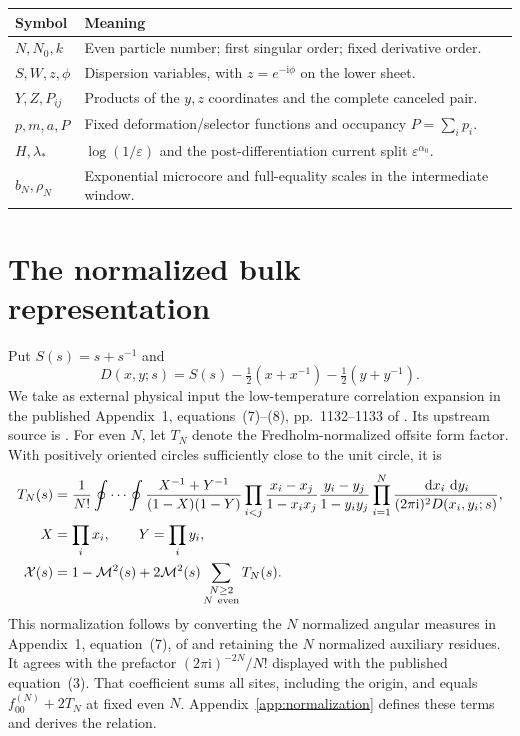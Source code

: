\documentclass[11pt]{article}
\numberwithin{equation}{section}
\theoremstyle{definition}
\newcommand{\dd}{\,\mathrm d}
\newcommand{\ii}{\mathrm i}
\newcommand{\eps}{\varepsilon}
\newcommand{\M}{\mathcal M}
\begin{document}
\begin{center}
\begin{tabular}{p{}p{}}
\toprule
Symbol & Meaning\\
\midrule
\(N,N_0,k\) & Even particle number; first singular order; fixed derivative order.\\
\(S,W,z,\phi\) & Dispersion variables, with \(z=e^{-\ii\phi}\) on the lower sheet.\\
\(Y,Z,P_{ij}\) & Products of the \(y,z\) coordinates and the complete canceled pair.\\
\(p,m,a,P\) & Fixed deformation/selector functions and occupancy \(P=\sum_i p_i\).\\
\(H,\lambda_*\) & \(\log(1/\eps)\) and the post-differentiation current split \(\eps^{\alpha_0}\).\\
\(b_N,\rho_N\) & Exponential microcore and full-equality scales in the intermediate window.\\
\bottomrule
\end{tabular}
\end{center}


\tableofcontents

\section{The normalized bulk representation}\label{sec:setup}
Put \(S(s)=s+s^{-1}\) and
\[
 D(x,y;s)=S(s)-\tfrac12(x+x^{-1})-\tfrac12(y+y^{-1}).
\]
We take as external physical input the low-temperature correlation
expansion in the published Appendix~1, equations~(7)--(8),
pp.~1132--1133 of \cite{TW2014}. Its upstream source is
\cite[Cor.~2.0, p.~351; Thm.~4.1, p.~361; Thm.~5.0, p.~374,
and proof pp.~375--378]{PalmerTracy1981}.
For even \(N\), let \(T_N\) denote the Fredholm-normalized offsite
form factor. With positively oriented circles sufficiently close to the
unit circle, it is
\begin{align}
 T_N(s)&=\frac1{N!}\oint\cdots\oint
 \frac{X^{-1}+Y^{-1}}{(1-X)(1-Y)}
 \prod_{i<j}\frac{x_i-x_j}{1-x_ix_j}
              \frac{y_i-y_j}{1-y_iy_j}
 \prod_{i=1}^N\frac{\dd x_i\,\dd y_i}{(2\pi\ii)^2D(x_i,y_i;s)},\label{eq:double}\\
 X&=\prod_i x_i,\qquad Y=\prod_i y_i, \nonumber\\
 \mathcal X(s)&=1-\M^2(s)+2\M^2(s)\sum_{\substack{N\ge2\\N\ {\rm even}}}T_N(s).
 \label{eq:bulk}
\end{align}
This normalization follows by converting the \(N\) normalized angular
measures in Appendix~1, equation~(7), of \cite{TW2014} and retaining
the \(N\) normalized auxiliary residues. It agrees with the prefactor
\((2\pi\ii)^{-2N}/N!\) displayed with the published equation~(3).
That coefficient sums all sites, including the origin, and equals
\(f_{00}^{(N)}+2T_N\) at fixed even \(N\).
Appendix~\ref{app:normalization} defines these terms and derives the relation.
\end{document}
